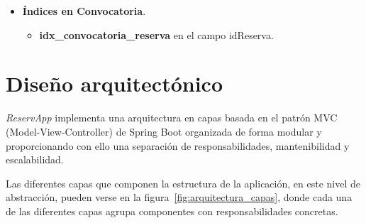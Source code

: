 \begin{itemize}
	\item \textbf{Índices en Convocatoria}.
	\begin{itemize}
       \item \textbf{idx\_convocatoria\_reserva} en el campo idReserva.
	\end{itemize}
\end{itemize}

\newpage

\section{Diseño arquitectónico}

\textit{ReservApp} implementa una arquitectura en capas basada en el patrón MVC (Model-View-Controller) de Spring Boot organizada de forma modular y proporcionando con ello una separación de responsabilidades, mantenibilidad y escalabilidad.

Las diferentes capas que componen la estructura de la aplicación, en este nivel de abstracción, pueden verse en la figura~\ref{fig:arquitectura_capas}, donde cada una de las diferentes capas agrupa componentes con responsabilidades concretas.


